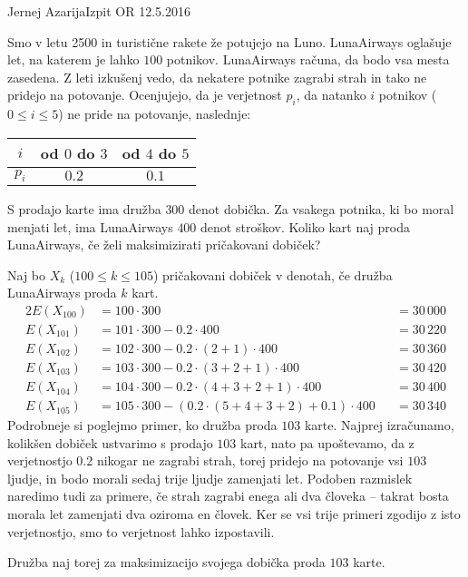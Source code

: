 \begin{naloga}{Jernej Azarija}{Izpit OR 12.5.2016}
\begin{vprasanje}
Smo v letu 2500 in turistične rakete že potujejo na Luno.
LunaAirways oglašuje let, na katerem je lahko $100$ potnikov.
LunaAirways računa, da bodo vsa mesta zasedena.
Z leti izkušenj vedo,
da nekatere potnike zagrabi strah in tako ne pridejo na potovanje.
Ocenjujejo, da je verjetnost $p_i$,
da natanko $i$ potnikov ($0 \le i \le 5$) ne pride na potovanje,
naslednje:
\begin{center}
\begin{tabular}{c|cc}
$i$ & od $0$ do $3$ & od $4$ do $5$ \\ \hline
$p_i$ & $0.2$ & $0.1$
\end{tabular}
\end{center}

S prodajo karte ima družba $300$ denot dobička.
Za vsakega potnika, ki bo moral menjati let,
ima LunaAirways $400$ denot stroškov.
Koliko kart naj proda LunaAirways, če želi maksimizirati pričakovani dobiček?
\end{vprasanje}

\begin{odgovor}
Naj bo $X_k$ ($100 \le k \le 105$) pričakovani dobiček v denotah,
če družba LunaAirways proda $k$ kart.
\begin{alignat*}{2}
E(X_{100}) &= 100 \cdot 300 &&= 30\,000 \\
E(X_{101}) &= 101 \cdot 300 - 0.2 \cdot 400 &&= 30\,220\\
E(X_{102}) &= 102 \cdot 300 - 0.2 \cdot (2+1) \cdot 400 &&= 30\,360\\
E(X_{103}) &= 103 \cdot 300 - 0.2 \cdot (3+2+1) \cdot 400 &&= 30\,420\\
E(X_{104}) &= 104 \cdot 300 - 0.2 \cdot (4+3+2+1) \cdot 400 &&= 30\,400\\
E(X_{105}) &= 105 \cdot 300 - (0.2 \cdot (5+4+3+2) + 0.1) \cdot 400 &&= 30\,340
\end{alignat*}
Podrobneje si poglejmo primer, ko družba proda $103$ karte.
Najprej izračunamo, kolikšen dobiček ustvarimo s prodajo $103$ kart,
nato pa upoštevamo, da z ve\-rjet\-nost\-jo $0.2$ nikogar ne zagrabi strah,
torej pridejo na potovanje vsi $103$ ljudje,
in bodo morali sedaj trije ljudje zamenjati let.
Podoben razmislek naredimo tudi za primere,
če strah zagrabi enega ali dva človeka
-- takrat bosta morala let zamenjati dva oziroma en človek.
Ker se vsi trije primeri zgodijo z isto verjetnostjo,
smo to verjetnost lahko izpostavili.

Družba naj torej za maksimizacijo svojega dobička proda $103$ karte.
\end{odgovor}
\end{naloga}
